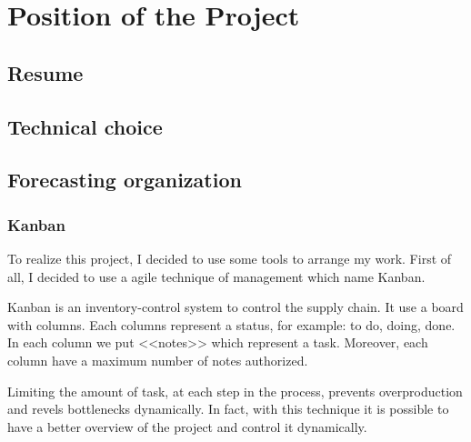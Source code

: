 
\chapter{Position of the Project}
\label{chap:project}


\section{Resume}

\section{Technical choice}


\section{Forecasting organization}

\subsection{Kanban}

To realize this project, I decided to use some tools to arrange my work. First
of all, I decided to use a agile technique of management which name Kanban.~\\



Kanban is an inventory-control system to control the supply chain. It use a
board with columns. Each columns represent a status, for example: to do, doing,
done. In each column we put <<notes>> which represent a task. Moreover, each
column have a maximum number of notes authorized.



Limiting the amount of task, at each step in the process, prevents
overproduction and revels bottlenecks dynamically. In fact, with this technique
it is possible to have a better overview of the project and control it dynamically.
~\\

